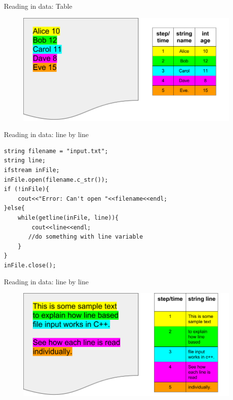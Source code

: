\documentclass[xcolor={dvipsnames}]{beamer}
\begin{document}
\begin{frame}{Reading in data: Table}
	\begin{figure}
		\includegraphics[width=1\textwidth]{readtable}
	\end{figure}
\end{frame}

\begin{frame}[fragile]{Reading in data: line by line}
\begin{verbatim}
string filename = "input.txt";
string line;
ifstream inFile;
inFile.open(filename.c_str());
if (!inFile){
    cout<<"Error: Can't open "<<filename<<endl;
}else{
    while(getline(inFile, line)){
        cout<<line<<endl;
       //do something with line variable
    }
}
inFile.close();
\end{verbatim}
\end{frame}

\begin{frame}{Reading in data: line by line}
	\begin{figure}
		\includegraphics[width=1\textwidth]{readline}
	\end{figure}
\end{frame}
\end{document}
